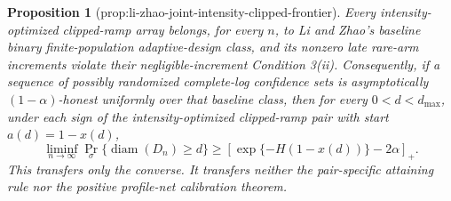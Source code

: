 \documentclass{article}
\newtheorem{proposition}{Proposition}
\begin{document}
\begin{proposition}[prop:li-zhao-joint-intensity-clipped-frontier]\label{prop:li-zhao-joint-intensity-clipped-frontier}
Every intensity-optimized clipped-ramp array belongs, for every \(n\), to Li and Zhao's baseline binary finite-population adaptive-design class, and its nonzero late rare-arm increments violate their negligible-increment Condition 3(ii). Consequently, if a sequence of possibly randomized complete-log confidence sets is asymptotically \((1-\alpha)\)-honest uniformly over that baseline class, then for every \(0<d<d_{\max}\), under each sign of the intensity-optimized clipped-ramp pair with start \(a(d)=1-x(d)\),
\[
 \liminf_{n\to\infty}
 \Pr_\sigma\{\operatorname{diam}(D_n)\ge d\}
 \ge
 \left[\exp\{-H(1-x(d))\}-2\alpha\right]_+.
\]
This transfers only the converse. It transfers neither the pair-specific attaining rule nor the positive profile-net calibration theorem.
\end{proposition}
\end{document}
